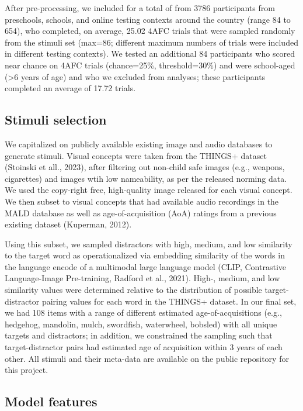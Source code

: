 \documentclass[
  man]{apa6}
\begin{document}
After pre-processing, we included for a total of from 3786 participants from preschools, schools, and online testing contexts around the country (range 84 to 654), who completed, on average, 25.02 4AFC trials that were sampled randomly from the stimuli set (max=86; different maximum numbers of trials were included in different testing contexts). We tested an additional 84 participants who scored near chance on 4AFC trials (chance=25\%, threshold=30\%) and were school-aged (\textgreater6 years of age) and who we excluded from analyses; these participants completed an average of 17.72 trials.

\subsection{Stimuli selection}\label{stimuli-selection}

We capitalized on publicly available existing image and audio databases to generate stimuli. Visual concepts were taken from the THINGS+ dataset (Stoinski et all., 2023), after filtering out non-child safe images (e.g., weapons, cigarettes) and images wtih low nameability, as per the released norming data. We used the copy-right free, high-quality image released for each visual concept. We then subset to visual concepts that had available audio recordings in the MALD database as well as age-of-acquisition (AoA) ratings from a previous existing dataset (Kuperman, 2012).

Using this subset, we sampled distractors with high, medium, and low similarity to the target word as operationalized via embedding similarity of the words in the language encode of a multimodal large language model (CLIP, Contrastive Language-Image Pre-training, Radford et al., 2021). High-, medium, and low similarity values were determined relative to the distribution of possible target-distractor pairing values for each word in the THINGS+ dataset. In our final set, we had 108 items with a range of different estimated age-of-acquisitions (e.g., hedgehog, mandolin, mulch, swordfish, waterwheel, bobsled) with all unique targets and distractors; in addition, we constrained the sampling such that target-distractor pairs had estimated age of acquisition within 3 years of each other. All stimuli and their meta-data are available on the public repository for this project.

\subsection{Model features}\label{model-features}
\end{document}
